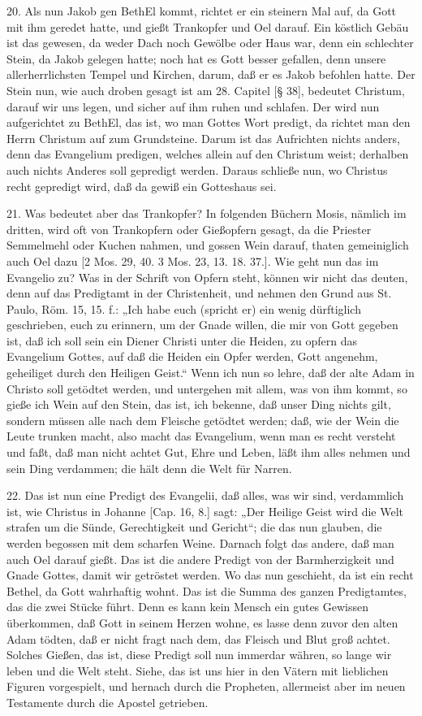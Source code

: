 20. Als nun Jakob gen BethEl kommt, richtet er ein steinern Mal auf, da Gott mit ihm geredet hatte, und gießt Trankopfer und Oel darauf. Ein köstlich Gebäu ist das gewesen, da weder Dach noch Gewölbe oder Haus war, denn ein schlechter Stein, da Jakob gelegen hatte; noch hat es Gott besser gefallen, denn unsere allerherrlichsten Tempel und Kirchen, darum, daß er es Jakob befohlen hatte. Der Stein nun, wie auch droben gesagt ist am 28. Capitel [§ 38], bedeutet Christum, darauf wir uns legen, und sicher auf ihm ruhen und schlafen. Der wird nun aufgerichtet zu BethEl, das ist, wo man Gottes Wort predigt, da richtet man den Herrn Christum auf zum Grundsteine. Darum ist das Aufrichten nichts anders, denn das Evangelium predigen, welches allein auf den Christum weist; derhalben auch nichts Anderes soll gepredigt werden. Daraus schließe nun, wo Christus recht gepredigt wird, daß da gewiß ein Gotteshaus sei.

21. Was bedeutet aber das Trankopfer? In folgenden Büchern Mosis, nämlich im dritten, wird oft von Trankopfern oder Gießopfern gesagt, da die Priester Semmelmehl oder Kuchen nahmen, und gossen Wein darauf, thaten gemeiniglich auch Oel dazu [2 Mos. 29, 40. 3 Mos. 23, 13. 18. 37.]. Wie geht nun das im Evangelio zu? Was in der Schrift von Opfern steht, können wir nicht das deuten, denn auf das Predigtamt in der Christenheit, und nehmen den Grund aus St. Paulo, Röm. 15, 15. f.: „Ich habe euch (spricht er) ein wenig dürftiglich geschrieben, euch zu erinnern, um der Gnade willen, die mir von Gott gegeben ist, daß ich soll sein ein Diener Christi unter die Heiden, zu opfern das Evangelium Gottes, auf daß die Heiden ein Opfer werden, Gott angenehm, geheiliget durch den Heiligen Geist.“ Wenn ich nun so lehre, daß der alte Adam in Christo soll getödtet werden, und untergehen mit allem, was von ihm kommt, so gieße ich Wein auf den Stein, das ist, ich bekenne, daß unser Ding nichts gilt, sondern müssen alle nach dem Fleische getödtet werden; daß, wie der Wein die Leute trunken macht, also macht das Evangelium, wenn man es recht versteht und faßt, daß man nicht achtet Gut, Ehre und Leben, läßt ihm alles nehmen und sein Ding verdammen; die hält denn die Welt für Narren.

22. Das ist nun eine Predigt des Evangelii, daß alles, was wir sind, verdammlich ist, wie Christus in Johanne [Cap. 16, 8.] sagt: „Der Heilige Geist wird die Welt strafen um die Sünde, Gerechtigkeit und Gericht“; die das nun glauben, die werden begossen mit dem scharfen Weine. Darnach folgt das andere, daß man auch Oel darauf gießt. Das ist die andere Predigt von der Barmherzigkeit und Gnade Gottes, damit wir getröstet werden. Wo das nun geschieht, da ist ein recht Bethel, da Gott wahrhaftig wohnt. Das ist die Summa des ganzen Predigtamtes, das die zwei Stücke führt. Denn es kann kein Mensch ein gutes Gewissen überkommen, daß Gott in seinem Herzen wohne, es lasse denn zuvor den alten Adam tödten, daß er nicht fragt nach dem, das Fleisch und Blut groß achtet. Solches Gießen, das ist, diese Predigt soll nun immerdar währen, so lange wir leben und die Welt steht. Siehe, das ist uns hier in den Vätern mit lieblichen Figuren vorgespielt, und hernach durch die Propheten, allermeist aber im neuen Testamente durch die Apostel getrieben.

